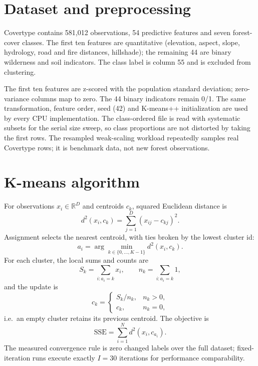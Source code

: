 \documentclass[10pt,a4paper]{article}
\begin{document}
\section{Dataset and preprocessing}
Covertype \citep{blackard1999} contains 581,012 observations, 54 predictive
features and seven forest-cover classes. The first ten features are
quantitative (elevation, aspect, slope, hydrology, road and fire distances,
hillshade); the remaining 44 are binary wilderness and soil indicators. The
class label is column 55 and is excluded from clustering.

The first ten features are z-scored with the population standard deviation;
zero-variance columns map to zero. The 44 binary indicators remain 0/1. The
same transformation, feature order, seed (42) and K-means++ initialization
\citep{arthur2007} are used by every CPU implementation. The class-ordered file
is read with systematic subsets for the serial size sweep, so class
proportions are not distorted by taking the first rows. The resampled
weak-scaling workload repeatedly samples real Covertype rows; it is benchmark
data, not new forest observations.

\section{K-means algorithm}
For observations $x_i\in\mathbb{R}^{D}$ and centroids $c_k$, squared Euclidean
distance is
\begin{equation}
d^2(x_i,c_k)=\sum_{j=1}^{D}(x_{ij}-c_{kj})^2 .
\end{equation}
Assignment selects the nearest centroid, with ties broken by the lowest
cluster id:
\begin{equation}
a_i=\arg\min_{k\in\{0,\ldots,K-1\}} d^2(x_i,c_k).
\end{equation}
For each cluster, the local sums and counts are
\begin{equation}
S_k=\sum_{i:a_i=k}x_i,\qquad n_k=\sum_{i:a_i=k}1,
\end{equation}
and the update is
\begin{equation}
c_k=\begin{cases}S_k/n_k,&n_k>0,\\ c_k,&n_k=0,\end{cases}
\end{equation}
i.e.\ an empty cluster retains its previous centroid. The objective is
\begin{equation}
\mathrm{SSE}=\sum_{i=1}^{N}d^2(x_i,c_{a_i}).
\end{equation}
The measured convergence rule is zero changed labels over the full dataset;
fixed-iteration runs execute exactly $I=30$ iterations for performance
comparability.
\end{document}

